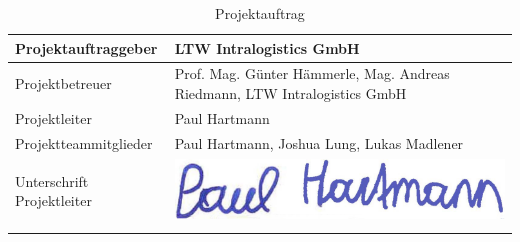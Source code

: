 \begin{longtable}{p{}|p{}}
  Projektauftraggeber        & LTW Intralogistics GmbH                                                                        \\ \midrule

  Projektbetreuer            & Prof. Mag. Günter Hämmerle, Mag. Andreas Riedmann, LTW Intralogistics GmbH                     \\ \midrule

  Projektleiter              & Paul Hartmann                                                                                  \\ \midrule

  Projektteammitglieder      & Paul Hartmann, Joshua Lung, Lukas Madlener                                                     \\ \midrule

  Unterschrift Projektleiter &
  \multicolumn{1}{c}{
  \begin{minipage}[c][13ex]{0.25\textwidth}
      \includegraphics[width=1\textwidth]{images/Unterschrift_Paul.png}
    \end{minipage}}                                                            \\
  \bottomrule
  \caption{Projektauftrag}
  \label{tab:projektauftrag}
\end{longtable}
